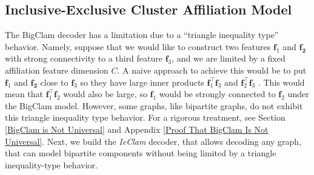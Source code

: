 \documentclass{article}
\theoremstyle{plain}
\theoremstyle{definition}
\theoremstyle{remark}
\begin{document}
\subsection{Inclusive-Exclusive Cluster Affiliation Model}






The BigClam decoder has a limitation due to a  ``triangle inequality type'' behavior. Namely, suppose that we would like to construct two features $\mathbf{f}_1$ and $\mathbf{f_2}$ with strong connectivity to a third feature $\mathbf{f}_3$, and  we are limited by a fixed affiliation feature dimension $C$. A naive approach to achieve this would be to put $\mathbf{f}_1$ and $\mathbf{f_2}$ close to $\mathbf{f}_3$ so they have large inner products $\mathbf{f}_1^{\top }\mathbf{f}_3$ and $\mathbf{f}_2^{\top }\mathbf{f}_3$ . This would mean that $\mathbf{f}_1^{\top }\mathbf{f}_2$ would also be large, so $\mathbf{f}_1$ would be strongly connected to  $\mathbf{f}_2$ under the BigClam model. However, some graphs, like bipartite graphs, do not exhibit this triangle inequality type behavior. For a rigorous treatment, see Section \ref{BigClam is Not Universal} and Appendix \ref{Proof That BigClam Is Not Universal}.  Next, we build the \emph{IeClam} decoder, that allows decoding any graph, that can model bipartite components without being limited by a  triangle inequality-type behavior. 
\end{document}
